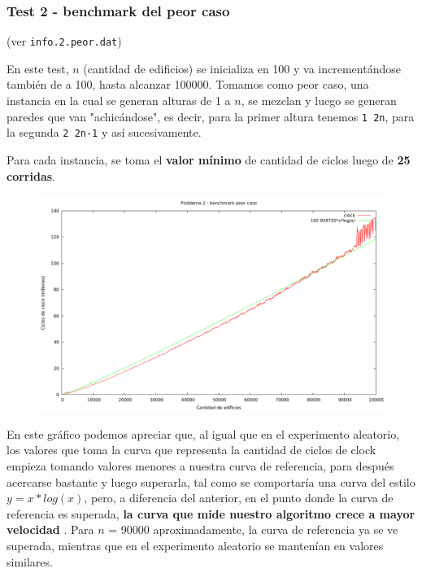 \newpage


\subsubsection{Test 2 - benchmark del peor caso}

(ver \verb|info.2.peor.dat|) \medskip

En este test, $n$ (cantidad de edificios) se inicializa en 100 y va incrementándose también de a 100,
hasta alcanzar 100000. Tomamos como peor caso, una instancia en la cual se generan alturas de 1 a $n$,
se mezclan y luego se generan paredes que van "achicándose", es decir, para la primer altura tenemos
\verb|1 2n|, para la segunda \verb|2 2n-1| y así sucesivamente.

Para cada instancia, se toma el \textbf{valor mínimo} de cantidad de ciclos luego de \textbf{25 corridas}.

\vspace*{0.5cm}

\begin{figure}[h]
  \begin{center}
    \includegraphics[scale=0.35]{imagenes/grafico-2-peor.png}
  \end{center}
\end{figure}

\vspace*{0.5cm}

En este gráfico podemos apreciar que, al igual que en el experimento aleatorio, los valores que toma la curva
que representa la cantidad de ciclos de clock empieza tomando valores menores a nuestra curva de referencia,
para después acercarse bastante y luego superarla, tal como se comportaría una curva del estilo $y = x*log(x)$,
pero, a diferencia del anterior, en el punto donde la curva de referencia es superada, \textbf{la curva que mide nuestro
algoritmo crece a mayor velocidad} . Para $n$ = 90000 aproximadamente, la curva de referencia ya se ve superada,
mientras que en el experimento aleatorio se mantenían en valores similares.


